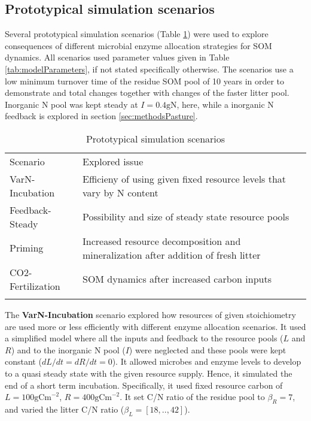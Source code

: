 \subsection{ Prototypical simulation scenarios} 
\label{sec:SimScen}

Several prototypical simulation scenarios (Table \ref{tab:SimScen}) were used to
explore consequences of different microbial enzyme allocation strategies for SOM
dynamics. All scenarios used parameter values given in Table
\ref{tab:modelParameters}, if not stated specifically otherwise. The
scenarios use a low minimum turnover time of the residue SOM pool of 10 years in
order to demonstrate and total changes together with changes of the faster
litter pool. Inorganic N pool was kept steady at $I=0.4 \mathrm{gN}$, here,
while a inorganic N feedback is explored in section \ref{sec:methodsPasture}.

\begin{table}[t]
\caption{Prototypical simulation scenarios \label{tab:SimScen}}
\vskip4mm
\centering
\begin{tabular}{lp{5.3cm}}
\tophline
Scenario & Explored issue\\
\middlehline
VarN-Incubation & Efficieny of using given fixed resource levels that
vary by N content \\
Feedback-Steady & Possibility and size of steady state resource pools\\
Priming & Increased resource decomposition and mineralization after
addition of fresh litter\\
CO2-Fertilization & SOM dynamics after increased carbon inputs\\
\bottomhline
\end{tabular}
\end{table}

The \textbf{VarN-Incubation} scenario explored how resources of given
stoichiometry are used more or less efficiently with different enzyme allocation
scenarios. It used a simplified model where all the inputs and feedback to the
resource pools ($L$ and $R$) and to the inorganic N pool ($I$) were neglected
and these pools were kept constant ($dL/dt = dR/dt = 0$). It allowed microbes
and enzyme levels to develop to a quasi steady state with the given resource
supply. Hence, it simulated the end of a short term incubation. Specifically, it
used fixed resource carbon of $L=100 \mathrm{gCm}^{-2}$, $R=400 \mathrm{gCm}^{-2}$.
It set C/N ratio of the residue pool to $\beta_R=7$, and varied the litter
C/N ratio ($\beta_L = [18,..,42]$).

